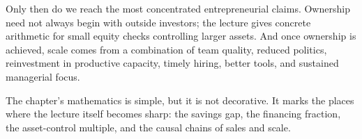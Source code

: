 Only then do we reach the most concentrated entrepreneurial claims. Ownership need not always begin with outside investors; the lecture gives concrete arithmetic for small equity checks controlling larger assets. And once ownership is achieved, scale comes from a combination of team quality, reduced politics, reinvestment in productive capacity, timely hiring, better tools, and sustained managerial focus.

The chapter's mathematics is simple, but it is not decorative. It marks the places where the lecture itself becomes sharp: the savings gap, the financing fraction, the asset-control multiple, and the causal chains of sales and scale.